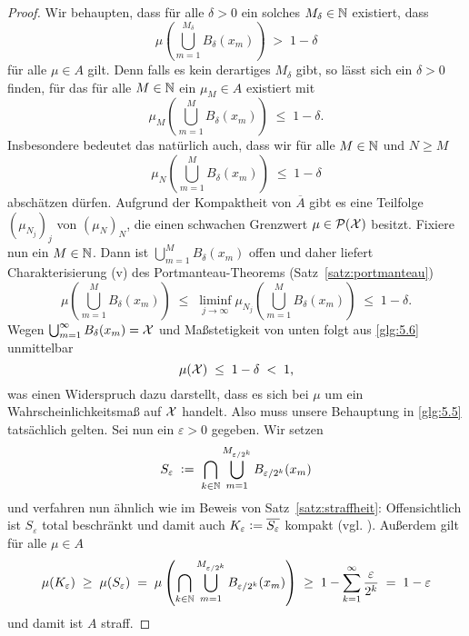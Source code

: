 \documentclass[../thesis/thesis.tex]{subfiles}
\begin{document}
\begin{proof}
		Wir behaupten, dass für alle $\delta > 0$ ein solches $M_\delta \in \mathbb{N}$ existiert, dass
		\[ \mu(\bigcup_{m=1}^{M_\delta} B_\delta(x_m)) \; > \; 1 - \delta \label{glg:5.5} \tag{5.5} \]
		für alle $\mu \in A$ gilt. Denn falls es kein derartiges $M_\delta$ gibt, so lässt sich ein $\delta > 0$ finden, für das
		für alle $M \in \mathbb{N}$ ein $\mu_M \in A$ existiert mit
		\[ \mu_M(\bigcup_{m=1}^{M} B_\delta(x_m)) \; \leq \; 1 - \delta \text{.} \]
		Insbesondere bedeutet das natürlich auch, dass wir für alle $M \in \mathbb{N}$ und $N \geq M$ 
		\[ \mu_N(\bigcup_{m=1}^{M} B_\delta(x_m)) \; \leq \; 1 - \delta \]
		abschätzen dürfen. Aufgrund der Kompaktheit von $\overline{A}$ gibt es eine Teilfolge $(\mu_{N_j})_j$ von $(\mu_N)_N$, 
		die einen schwachen Grenzwert $\mu \in \mathcal{P}(\mathcal{X})$ besitzt. Fixiere nun ein $M \in \mathbb{N}$. 
		Dann ist $\bigcup_{m=1}^{M} B_\delta(x_m)$
		offen und daher liefert Charakterisierung (v) des Portmanteau-Theorems (Satz~\ref{satz:portmanteau})
		\[ \mu(\bigcup_{m=1}^{M} B_\delta(x_m)) 
		\; \leq \; \liminf_{j \to \infty} \mu_{N_j}(\bigcup_{m=1}^{M} B_\delta(x_m)) 
		\; \leq \; 1 - \delta \text{.} \label{glg:5.6} \tag{5.6} \]
		Wegen $\bigcup_{m=1}^{\infty} B_\delta(x_m) = \mathcal{X}$ und Maßstetigkeit von unten 
		folgt aus \eqref{glg:5.6} unmittelbar 
		\[ \mu(\mathcal{X}) \; \leq \; 1 - \delta \; < \; 1 \text{,} \]
		was einen Widerspruch dazu darstellt, dass es sich bei $\mu$ um ein 
		Wahrscheinlichkeitsmaß auf $\mathcal{X}$ handelt. Also muss unsere Behauptung in \eqref{glg:5.5} tatsächlich gelten.
		Sei nun ein $\varepsilon > 0$ gegeben. Wir setzen 
		\[ S_\varepsilon 
		\; \vcentcolon = \; \bigcap_{k \in \mathbb{N}} \bigcup_{m=1}^{M_{\varepsilon / 2^k}} 
		B_{\varepsilon / 2^k}(x_m) \]
		und verfahren nun ähnlich wie im Beweis von Satz~\ref{satz:straffheit}: Offensichtlich ist $S_\varepsilon$ total beschränkt und damit auch 
		$ K_\varepsilon \vcentcolon = \overline{S_\varepsilon}$ kompakt (vgl. \cite[Satz 2.3.8]{Simon.2015}). 
		Außerdem gilt für alle $\mu \in A$
		\[
		\mu(K_\varepsilon) \; \geq \; \mu(S_\varepsilon) \; = \; \mu\left(\bigcap_{k \in \mathbb{N}} \bigcup_{m=1}^{M_{\varepsilon / 2^k}} 
		B_{\varepsilon / 2^k}(x_m)\right)
		\; \geq \; 1 - \sum_{k=1}^{\infty} \frac{\varepsilon}{2^k} \; = \; 1 - \varepsilon
		\]
		und damit ist $A$ straff.
	\end{proof}
	
\end{document}
